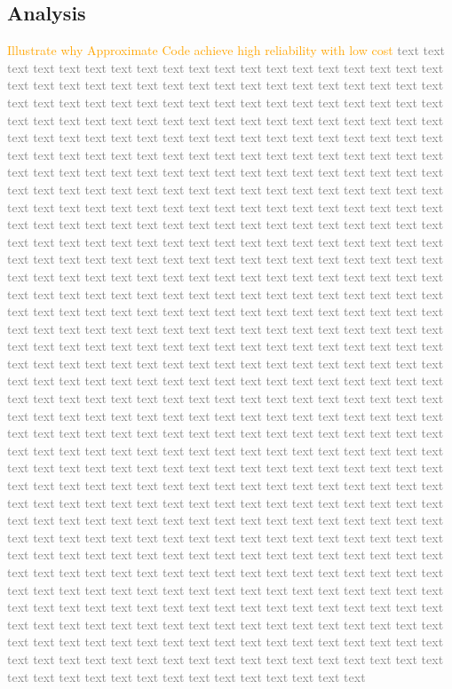 \documentclass[sigconf]{acmart}
\begin{document}
\subsection{Analysis}
\textcolor{orange}{Illustrate why Approximate Code achieve high reliability with low cost}
\textcolor{gray}{
    text text text text text text text text text text text text text text text text text text text text text text text text text text text text text text text text text text text text text text text text text text text text text text text text text text text text text text text text text text text text text text text text text text text text text text text text text text text text text text text text text text text text text text text text text text text text text text text text text text text text text text text text text text text text text text text text text text text text text text text text text text text text text text text text text text text text text text text text text text text text text text text text text text text text text text text text text text text text text text text text text text text text text text text text text text text text text text text text text text text text text text
    text text text text text text text text text text text text text text text text text text text text text text text text text text text text text text text text text text text text text text text text text text text text text text text text text text text text text text text text text text text text text text text text text text text text text text text text text text text text text text text text text text text text text text text text text text text text text text text text text text text text text text text text text text text text text text text text text text text text text text text text text text text text text text text text text text text text text text text text text text text text text text text text text text text text text text text text text text text text text text text text text text text text text text text text text text text text text text text text text text text text text text text text text text text text text text text text text text text text text text text text text text text text text text text text text text text text text text text text text text text text text text text text text text text text text text text text text text text text text text text text text text text text text text text text text text text text text text text text text text text text text text text text text text text text text text text text text text text text text text text text text text text text text text text text text text text text text text text text text text text text text text text text text text text text text text text text text text text text text text text text text text text text text text text text text text text text text text text text text text text text text text text text text text text text text text text text text text text text text text text text text text text text
    text text text text text text text text text text text text text text text text text text text text text text text text text text text text text text text text text text text text text text text text text text text text text text text text text text text text text text text text text text text text text text text text text
}
\end{document}

